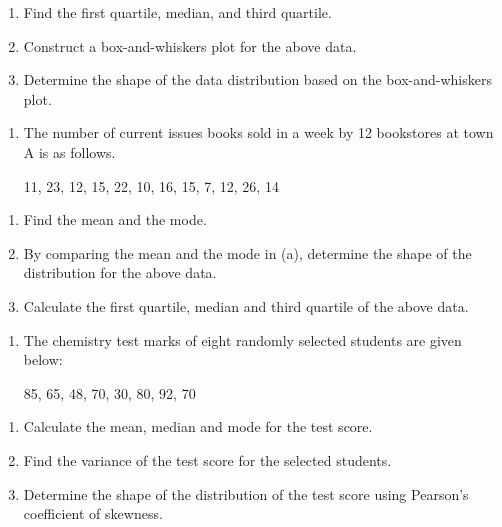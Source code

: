 \documentclass[
  a4paper,
  DIV=11,
  numbers=noendperiod,
  oneside]{scrreprt}
\providecommand{\tightlist}{%
  \setlength{\itemsep}{0pt}\setlength{\parskip}{0pt}}\usepackage{longtable,booktabs,array}
\begin{document}
\begin{enumerate}
\def\labelenumi{\alph{enumi}.}
\tightlist
\item
  Find the first quartile, median, and third quartile.
\item
  Construct a box-and-whiskers plot for the above data.
\item
  Determine the shape of the data distribution based on the
  box-and-whiskers plot.
\end{enumerate}

\begin{enumerate}
\def\labelenumi{\arabic{enumi}.}
\setcounter{enumi}{2}
\tightlist
\item
  The number of current issues books sold in a week by 12 bookstores at
  town A is as follows.

  11, 23, 12, 15, 22, 10, 16, 15, 7, 12, 26, 14
\end{enumerate}

\begin{enumerate}
\def\labelenumi{\alph{enumi}.}
\tightlist
\item
  Find the mean and the mode.
\item
  By comparing the mean and the mode in (a), determine the shape of the
  distribution for the above data.
\item
  Calculate the first quartile, median and third quartile of the above
  data.
\end{enumerate}

\begin{enumerate}
\def\labelenumi{\arabic{enumi}.}
\setcounter{enumi}{3}
\tightlist
\item
  The chemistry test marks of eight randomly selected students are given
  below:

  85, 65, 48, 70, 30, 80, 92, 70
\end{enumerate}

\begin{enumerate}
\def\labelenumi{\alph{enumi}.}
\tightlist
\item
  Calculate the mean, median and mode for the test score.
\item
  Find the variance of the test score for the selected students.
\item
  Determine the shape of the distribution of the test score using
  Pearson's coefficient of skewness.
\end{enumerate}
\end{document}
